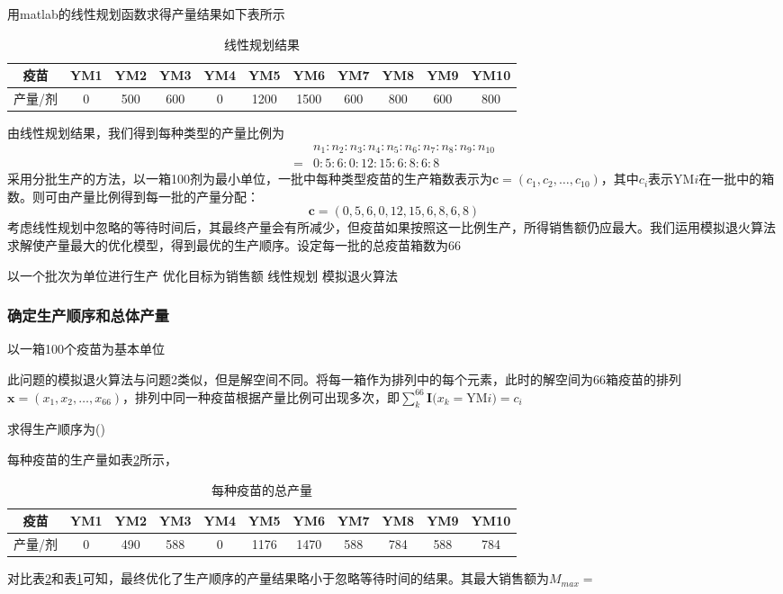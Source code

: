\documentclass[UTF8]{ctexart}
\begin{document}
	用matlab的线性规划函数求得产量结果如下表所示
	\begin{table}[H]
		\centering
		\caption{线性规划结果}\label{chanliang1}
		\begin{tabular}{ c| c| c |c|c|c|c|c|c|c|c}
			\hline
			疫苗 & YM1 & YM2 & YM3 & YM4 & YM5 & YM6 & YM7 & YM8 & YM9 & YM10 \\
			\hline
			 产量/剂 & 0 & 500 & 600 & 0 & 1200 & 1500 & 600 & 800 & 600 & 800 \\
			 \hline
		\end{tabular}
	\end{table}
	\par 由线性规划结果，我们得到每种类型的产量比例为
	\begin{equation}
	\begin{split}
	&n_1:n_2:n_3:n_4:n_5:n_6:n_7:n_8:n_9:n_{10}\\
	=&0:5:6:0:12:15:6:8:6:8
	\end{split}
	\end{equation}
	采用分批生产的方法，以一箱100剂为最小单位，一批中每种类型疫苗的生产箱数表示为$\boldsymbol{c}=(c_{1},c_{2},\dots,c_{10})$，其中$c_{i}$表示YM$i$在一批中的箱数。则可由产量比例得到每一批的产量分配：
	\begin{equation}
		\boldsymbol{c}=(0,5,6,0,12,15,6,8,6,8)
	\end{equation}
	考虑线性规划中忽略的等待时间后，其最终产量会有所减少，但疫苗如果按照这一比例生产，所得销售额仍应最大。我们运用模拟退火算法求解使产量最大的优化模型，得到最优的生产顺序。设定每一批的总疫苗箱数为66
	\par 以一个批次为单位进行生产
	优化目标为销售额
	线性规划
	模拟退火算法
	\subsubsection{确定生产顺序和总体产量}
	以一箱100个疫苗为基本单位
	\par 此问题的模拟退火算法与问题2类似，但是解空间不同。将每一箱作为排列中的每个元素，此时的解空间为66箱疫苗的排列$\boldsymbol{x}=(x_{1},x_{2},\dots,x_{66})$，排列中同一种疫苗根据产量比例可出现多次，即$\sum_{k}^{66}\boldsymbol{I}(x_{k}=$YM$i)=c_{i}$
	\par 求得生产顺序为()
	\par 每种疫苗的生产量如表\ref{chanliang2}所示，
	\begin{table}[H]	
		\centering
		\caption{每种疫苗的总产量}\label{chanliang2}
		\begin{tabular}{ c| c| c |c|c|c|c|c|c|c|c}
			\hline
			疫苗 & YM1 & YM2 & YM3 & YM4 & YM5 & YM6 & YM7 & YM8 & YM9 & YM10 \\
			\hline
			 产量/剂 & 0 & 490 & 588 & 0 & 1176 & 1470 & 588 & 784 & 588 & 784 \\
			 \hline
		\end{tabular}
	\end{table}
	对比表\ref{chanliang2}和表\ref{chanliang1}可知，最终优化了生产顺序的产量结果略小于忽略等待时间的结果。其最大销售额为$M_{max}=$
	
\end{document}
